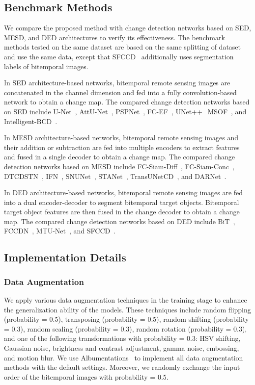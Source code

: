 \documentclass[journal]{IEEEtran}
\begin{document}
\subsection{Benchmark Methods}
We compare the proposed method with change detection networks based on SED, MESD, and DED architectures to verify its effectiveness. The benchmark methods tested on the same dataset are based on the same splitting of dataset and use the same data, except that SFCCD~\cite{njds} additionally uses segmentation labels of bitemporal images.

In SED architecture-based networks, bitemporal remote sensing images are concatenated in the channel dimension and fed into a fully convolution-based network to obtain a change map. The compared change detection networks based on SED include U-Net~\cite{unet}, AttU-Net~\cite{aunet}, PSPNet~\cite{psp}, FC-EF~\cite{fcef}, UNet++\_MSOF~\cite{etecd}, and Intelligent-BCD~\cite{ibcd}.

In MESD architecture-based networks, bitemporal remote sensing images and their addition or subtraction are fed into multiple encoders to extract features and fused in a single decoder to obtain a change map. The compared change detection networks based on MESD include FC-Siam-Diff~\cite{fcef}, FC-Siam-Conc~\cite{fcef}, DTCDSTN~\cite{dtcdstn}, IFN~\cite{dsifn}, SNUNet~\cite{snu}, STANet~\cite{sta}, TransUNetCD~\cite{transunetcd}, and DARNet~\cite{darn}.

In DED architecture-based networks, bitemporal remote sensing images are fed into a dual encoder-decoder to segment bitemporal target objects. Bitemporal target object features are then fused in the change decoder to obtain a change map. The compared change detection networks based on DED include BiT~\cite{bit}, FCCDN~\cite{fccdn}, MTU-Net~\cite{mtu}, and SFCCD~\cite{njds}.

\subsection{Implementation Details}

\subsubsection{Data Augmentation}

We apply various data augmentation techniques in the training stage to enhance the generalization ability of the models. These techniques include random flipping (probability = 0.5), transposing (probability = 0.5), random shifting (probability = 0.3), random scaling (probability = 0.3), random rotation (probability = 0.3), and one of the following transformations with probability = 0.3: HSV shifting, Gaussian noise, brightness and contrast adjustment, gamma noise, embossing, and motion blur. We use Albumentations~\cite{albu} to implement all data augmentation methods with the default settings. Moreover, we randomly exchange the input order of the bitemporal images with probability = 0.5.
\end{document}
